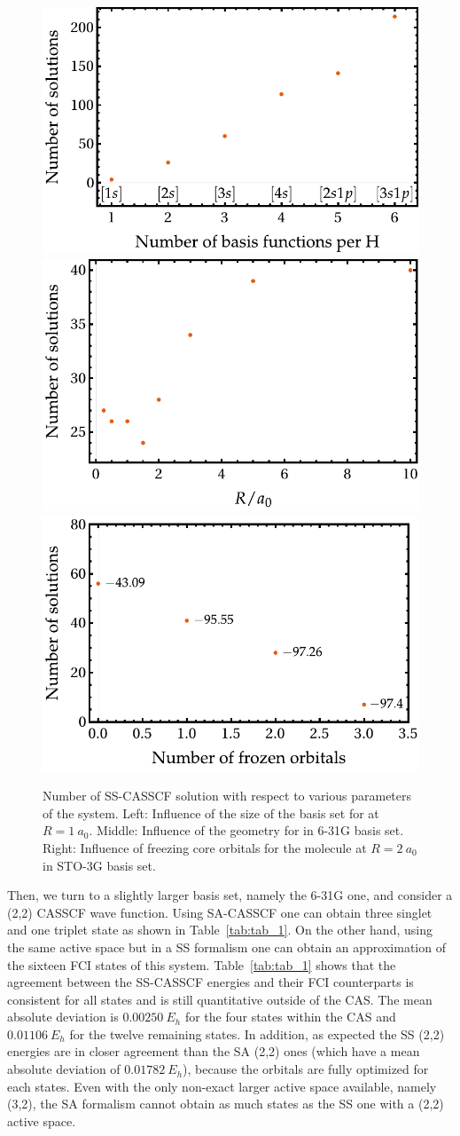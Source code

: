 \documentclass[aps,prb,reprint,showkeys,superscriptaddress]{revtex4-1}
\begin{document}
\begin{figure}
  \includegraphics[width=0.3\linewidth]{Figures/fig_2a.pdf}
  \hspace{0.03\linewidth}
  \includegraphics[width=0.3\linewidth]{Figures/fig_2b.pdf}
  \hspace{0.03\linewidth}
  \includegraphics[width=0.3\linewidth]{Figures/fig_2c.pdf}
  \caption{Number of SS-CASSCF solution with respect to various parameters of the system. Left: Influence of the size of the basis set for  at $R=1~a_0$. Middle: Influence of the geometry for  in 6-31G basis set. Right: Influence of freezing core orbitals for the  molecule at $R=2~a_0$ in STO-3G basis set. \label{fig:fig_2}}
\end{figure}

Then, we turn to a slightly larger basis set, namely the 6-31G one, \cite{Ditchfield_1971} and consider a (2,2) CASSCF wave function.
Using SA-CASSCF one can obtain three singlet and one triplet state as shown in Table~\ref{tab:tab_1}.
On the other hand, using the same active space but in a SS formalism one can obtain an approximation of the sixteen FCI states of this system.
Table~\ref{tab:tab_1} shows that the agreement between the SS-CASSCF energies and their FCI counterparts is consistent for all states and is still quantitative outside of the CAS.
The mean absolute deviation is $0.00250~E_h$ for the four states within the CAS and $0.01106~E_h$ for the twelve remaining states.
In addition, as expected the SS (2,2) energies are in closer agreement than the SA (2,2) ones (which have a mean absolute deviation of $0.01782~E_h$), because the orbitals are fully optimized for each states.
Even with the only non-exact larger active space available, namely (3,2), the SA formalism cannot obtain as much states as the SS one with a (2,2) active space.
\end{document}

